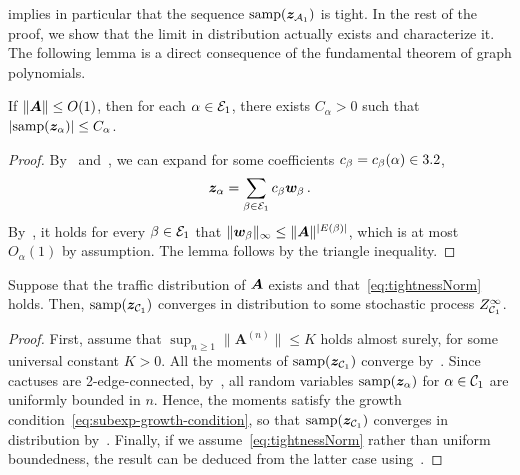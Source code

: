 \noindent {}
implies in particular 
that the sequence $\mathrm{samp}({\bm z}_{{\cal A}_1})$ is
tight. In the rest of the proof, we 
show that the limit in distribution
actually exists and characterize it.
The following lemma is a direct consequence
of the fundamental theorem of graph
polynomials.

\begin{lemma}
    \label{lem:2ec-bounded}
    If $\|{\bm A}\|\le O(1)$, then for each $\alpha\in{\cal E}_1$, there
    exists $C_\alpha>0$ such that
    $|\mathrm{samp}({\bm z}_\alpha)|\le C_\alpha$.
\end{lemma}

\begin{proof}
    By~ and~, we can
    expand for some coefficients $c_\beta = c_\beta(\alpha)\in3.2$,
    \[
        {\bm z}_\alpha = \sum_{\beta\in{\cal E}_1} c_\beta {\bm w}_\beta\,.
    \]
    By~,
    it holds for every $\beta\in{\cal E}_1$
    that $\|{\bm w}_\beta\|_\infty\le \|{\bm A}\|^{|E(\beta)|}$, which is at most
    $O_\alpha(1)$ by assumption.
    The lemma follows by the triangle inequality.
\end{proof}

\begin{lemma}
    \label{lem:cactus-converge}
    Suppose that the traffic distribution
    of ${\bm A}$ exists and that~\cref{eq:tightnessNorm} holds. Then,
    $\mathrm{samp}({\bm z}_{{\cal C}_1})$
    converges in distribution to some
    stochastic process $Z^\infty_{{\cal C}_1}$.
\end{lemma}

\begin{proof}    
    First, assume that $\sup_{n\ge 1} \|\bm A^{(n)}\|\le K$ holds almost surely, for some universal constant $K>0$. All the moments of $\mathrm{samp}({\bm z}_{{\cal C}_1})$ converge
    by~.
    Since cactuses are 2-edge-connected, by~, all random
    variables $\mathrm{samp}({\bm z}_\alpha)$
    for $\alpha\in{\cal C}_1$ are uniformly
    bounded in $n$. Hence, the moments satisfy the growth condition~\cref{eq:subexp-growth-condition}, so that
    $\mathrm{samp}({\bm z}_{{\cal C}_1})$ converges
    in distribution by~. 
    Finally, if we assume~\cref{eq:tightnessNorm} rather
    than uniform boundedness, the result
    can be deduced from the latter case
    using~.
\end{proof}





